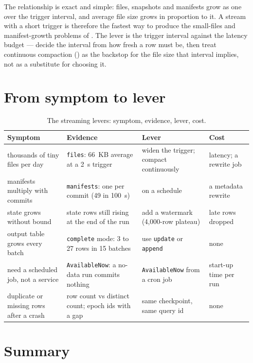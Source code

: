 The relationship is exact and simple: files, snapshots and manifests grow as one
over the trigger interval, and average file size grows in proportion to it. A
stream with a short trigger is therefore the fastest way to produce the
small-files and manifest-growth problems of . The lever is
the trigger interval against the latency budget --- decide the interval from how
fresh a row must be, then treat continuous compaction
() as the backstop for the file size that interval
implies, not as a substitute for choosing it.

\section{From symptom to lever}
\label{sec:stream-levers}

\begin{table}[htbp]
\centering\footnotesize
\renewcommand{\arraystretch}{1.25}
\begin{tabular}{@{}P{3.1cm}P{3.7cm}P{4.1cm}P{3.2cm}@{}}
\toprule
\textbf{Symptom} & \textbf{Evidence} & \textbf{Lever} & \textbf{Cost} \\
\midrule
thousands of tiny files per day & \texttt{files}: 66~KB average at a 2~s trigger & widen the trigger; compact continuously & latency; a rewrite job \\
manifests multiply with commits & \texttt{manifests}: one per commit (49 in 100~s) &  on a schedule & a metadata rewrite \\
state grows without bound & state rows still rising at the end of the run & add a watermark (4,000-row plateau) & late rows dropped \\
output table grows every batch & \texttt{complete} mode: 3 to 27 rows in 15 batches & use \texttt{update} or \texttt{append} & none \\
need a scheduled job, not a service & \texttt{AvailableNow}: a no-data run commits nothing & \texttt{AvailableNow} from a cron job & start-up time per run \\
duplicate or missing rows after a crash & row count vs distinct count; epoch ids with a gap & same checkpoint, same query id & none \\
\bottomrule
\end{tabular}
\caption{The streaming levers: symptom, evidence, lever, cost.}
\label{tab:stream-levers}
\end{table}

\section{Summary}
\label{sec:stream-summary}

